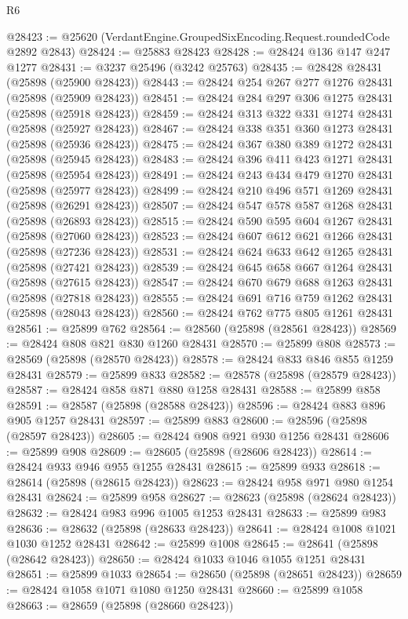 \begin{lexlean}{R6}
\begin{coremodule}
@28423 := @25620 (VerdantEngine.GroupedSixEncoding.Request.roundedCode @2892 @2843)
@28424 := @25883 @28423
@28428 := @28424 @136 @147 @247 @1277
@28431 := @3237 @25496 (@3242 @25763)
@28435 := @28428 @28431 (@25898 (@25900 @28423))
@28443 := @28424 @254 @267 @277 @1276 @28431 (@25898 (@25909 @28423))
@28451 := @28424 @284 @297 @306 @1275 @28431 (@25898 (@25918 @28423))
@28459 := @28424 @313 @322 @331 @1274 @28431 (@25898 (@25927 @28423))
@28467 := @28424 @338 @351 @360 @1273 @28431 (@25898 (@25936 @28423))
@28475 := @28424 @367 @380 @389 @1272 @28431 (@25898 (@25945 @28423))
@28483 := @28424 @396 @411 @423 @1271 @28431 (@25898 (@25954 @28423))
@28491 := @28424 @243 @434 @479 @1270 @28431 (@25898 (@25977 @28423))
@28499 := @28424 @210 @496 @571 @1269 @28431 (@25898 (@26291 @28423))
@28507 := @28424 @547 @578 @587 @1268 @28431 (@25898 (@26893 @28423))
@28515 := @28424 @590 @595 @604 @1267 @28431 (@25898 (@27060 @28423))
@28523 := @28424 @607 @612 @621 @1266 @28431 (@25898 (@27236 @28423))
@28531 := @28424 @624 @633 @642 @1265 @28431 (@25898 (@27421 @28423))
@28539 := @28424 @645 @658 @667 @1264 @28431 (@25898 (@27615 @28423))
@28547 := @28424 @670 @679 @688 @1263 @28431 (@25898 (@27818 @28423))
@28555 := @28424 @691 @716 @759 @1262 @28431 (@25898 (@28043 @28423))
@28560 := @28424 @762 @775 @805 @1261 @28431
@28561 := @25899 @762
@28564 := @28560 (@25898 (@28561 @28423))
@28569 := @28424 @808 @821 @830 @1260 @28431
@28570 := @25899 @808
@28573 := @28569 (@25898 (@28570 @28423))
@28578 := @28424 @833 @846 @855 @1259 @28431
@28579 := @25899 @833
@28582 := @28578 (@25898 (@28579 @28423))
@28587 := @28424 @858 @871 @880 @1258 @28431
@28588 := @25899 @858
@28591 := @28587 (@25898 (@28588 @28423))
@28596 := @28424 @883 @896 @905 @1257 @28431
@28597 := @25899 @883
@28600 := @28596 (@25898 (@28597 @28423))
@28605 := @28424 @908 @921 @930 @1256 @28431
@28606 := @25899 @908
@28609 := @28605 (@25898 (@28606 @28423))
@28614 := @28424 @933 @946 @955 @1255 @28431
@28615 := @25899 @933
@28618 := @28614 (@25898 (@28615 @28423))
@28623 := @28424 @958 @971 @980 @1254 @28431
@28624 := @25899 @958
@28627 := @28623 (@25898 (@28624 @28423))
@28632 := @28424 @983 @996 @1005 @1253 @28431
@28633 := @25899 @983
@28636 := @28632 (@25898 (@28633 @28423))
@28641 := @28424 @1008 @1021 @1030 @1252 @28431
@28642 := @25899 @1008
@28645 := @28641 (@25898 (@28642 @28423))
@28650 := @28424 @1033 @1046 @1055 @1251 @28431
@28651 := @25899 @1033
@28654 := @28650 (@25898 (@28651 @28423))
@28659 := @28424 @1058 @1071 @1080 @1250 @28431
@28660 := @25899 @1058
@28663 := @28659 (@25898 (@28660 @28423))

\end{coremodule}
\end{lexlean}
